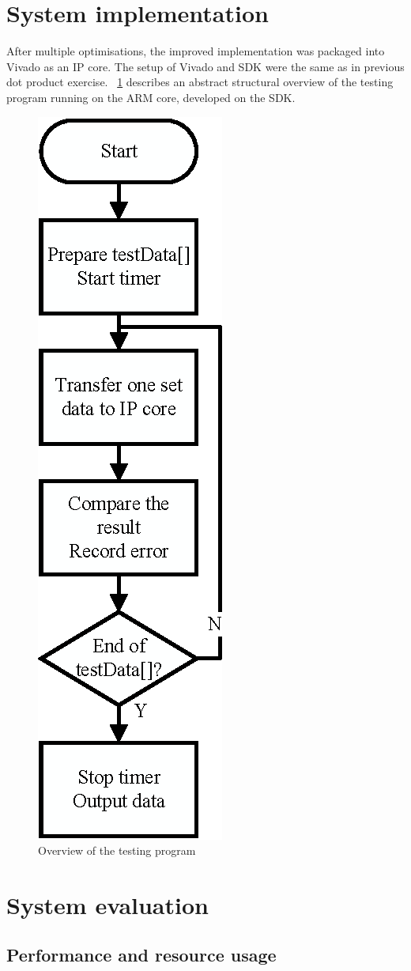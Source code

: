 \documentclass[journal]{IEEEtran}
\newcommand{\fref}[1]{\figurename~\ref{#1}}
\newcommand{\improvi}[1]{\improv[inline]{#1}}
\begin{document}
\improvi{More?}

\section{System implementation}

After multiple optimisations, the improved implementation was packaged into Vivado as an IP core. The setup of Vivado and SDK were the same as in previous dot product exercise. \fref{fig:sdk} describes an abstract structural overview of the testing program running on the ARM core, developed on the SDK.

\begin{figure}[t]
	\centering
	\includegraphics[width=0.3\columnwidth]{sdk}
	\caption{Overview of the testing program}
	\label{fig:sdk}
\end{figure}

\section{System evaluation}

\subsection{Performance and resource usage}
\end{document}
